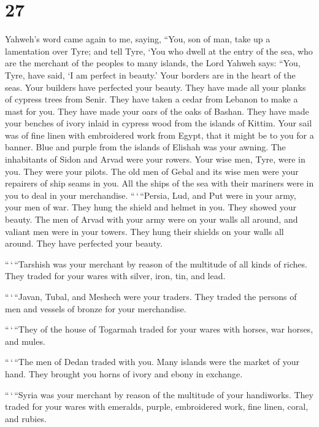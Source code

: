 \hypertarget{section-25}{%
\section{27}\label{section-25}}

 Yahweh's word came again to me, saying,  ``You,
son of man, take up a lamentation over Tyre;  and tell Tyre,
`You who dwell at the entry of the sea, who are the merchant of the
peoples to many islands, the Lord Yahweh says: ``You, Tyre, have said,
`I am perfect in beauty.'  Your borders are in the heart of
the seas. Your builders have perfected your beauty.  They
have made all your planks of cypress trees from Senir. They have taken a
cedar from Lebanon to make a mast for you.  They have made
your oars of the oaks of Bashan. They have made your benches of ivory
inlaid in cypress wood from the islands of Kittim.  Your
sail was of fine linen with embroidered work from Egypt, that it might
be to you for a banner. Blue and purple from the islands of Elishah was
your awning.  The inhabitants of Sidon and Arvad were your
rowers. Your wise men, Tyre, were in you. They were your pilots.
 The old men of Gebal and its wise men were your repairers
of ship seams in you. All the ships of the sea with their mariners were
in you to deal in your merchandise.  ``\,`\,``Persia, Lud,
and Put were in your army, your men of war. They hung the shield and
helmet in you. They showed your beauty.  The men of Arvad
with your army were on your walls all around, and valiant men were in
your towers. They hung their shields on your walls all around. They have
perfected your beauty.

 ``\,`\,``Tarshish was your merchant by reason of the
multitude of all kinds of riches. They traded for your wares with
silver, iron, tin, and lead.

 ``\,`\,``Javan, Tubal, and Meshech were your traders. They
traded the persons of men and vessels of bronze for your merchandise.

 ``\,`\,``They of the house of Togarmah traded for your
wares with horses, war horses, and mules.

 ``\,`\,``The men of Dedan traded with you. Many islands
were the market of your hand. They brought you horns of ivory and ebony
in exchange.

 ``\,`\,``Syria was your merchant by reason of the
multitude of your handiworks. They traded for your wares with emeralds,
purple, embroidered work, fine linen, coral, and rubies.

